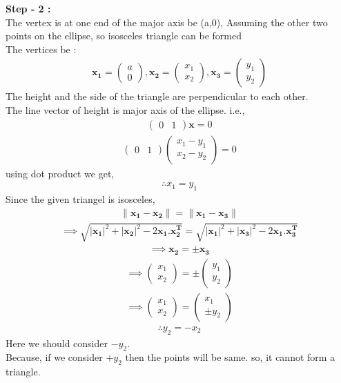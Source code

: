 \documentclass[10pt,a4paper]{report}
\newcommand{\myvec}[1]{\ensuremath{\begin{pmatrix}#1\end{pmatrix}}}
\let\vec\mathbf
\begin{document}
\raggedright \textbf{Step - 2 :}\\ \vspace{2mm}
The vertex is at one end of the major axis be (a,0),
Assuming the other two points on the ellipse, so isosceles triangle can be formed\\ \vspace{1mm}
The vertices be :
\begin{align}
\vec{x_1}=\myvec{a\\0} , \vec{x_2}=\myvec{x_1\\x_2}, \vec{x_3}=\myvec{y_1\\y_2}
\end{align}
The height and the side of the triangle are perpendicular to each other.\\
The line vector of height is major axis of the ellipse. 
i.e.,
\begin{align*}
\myvec{0&1} \vec{x}=0
\end{align*}
\begin{align}
\myvec{0&1}\myvec{x_1-y_1\\x_2-y_2}=0
\end{align}
using dot product we get,
\begin{align}
\therefore x_1=y_1
\end{align}
Since the given triangel is isosceles,
\begin{align}
\|\vec{x_1}-\vec{x_2}\|=\|\vec{x_1}-\vec{x_3}\|
\end{align}
\begin{align*}
\implies \sqrt{|\vec{x_1}|^2+|\vec{x_2}|^2-2\vec{x_1.x_2^T}}=\sqrt{|\vec{x_1}|^2+|\vec{x_3}|^2-2\vec{x_1.x_3^T}}
\end{align*}
\begin{align}
\implies \vec{x_2}=\pm \vec{x_3}
\end{align}
\begin{align*}
\implies \myvec{x_1\\x_2}=\pm \myvec{y_1\\y_2}
\end{align*}
\begin{align*}
\implies \myvec{x_1\\x_2}=\myvec{x_1\\ \pm y_2}
\end{align*}
\begin{align}
\therefore y_2 = - x_2
\end{align}
\centering Here we should consider $-y_2$. \\Because, if we consider $+y_2$ then the points will be same. so, it cannot form a triangle.\\ \vspace{3mm}
\end{document}

